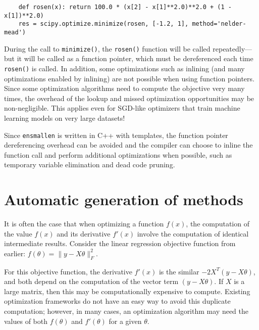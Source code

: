 \documentclass{article}
\begin{document}
\vspace*{-0.3em}
\begin{verbatim}
    def rosen(x): return 100.0 * (x[2] - x[1]**2.0)**2.0 + (1 - x[1])**2.0)
    res = scipy.optimize.minimize(rosen, [-1.2, 1], method='nelder-mead')
\end{verbatim}
\vspace*{-0.3em}

During the call to {\tt minimize()}, the {\tt rosen()} function will be called
repeatedly---but it will be called as a function pointer, which must be
dereferenced each time {\tt rosen()} is called.  In addition, some
optimizations such as inlining (and many optimizations enabled by inlining) are
not possible when using function pointers.  Since some optimization algorithms
need to compute the objective very many times, the overhead of the lookup and
missed optimization opportunities may be non-negligible.  This applies even for
SGD-like optimizers that train machine learning models on very large datasets!

Since {\tt ensmallen} is written in C++ with templates, the function pointer
dereferencing overhead can be avoided and the compiler can choose to inline the
function call and perform additional optimizations when possible, such as
temporary variable elimination and dead code pruning.

\vspace*{-0.3em}
\section{Automatic generation of methods}
\vspace*{-0.5em}

It is often the case that when optimizing a function $f(x)$, the computation of
the value $f(x)$ and its derivative $f'(x)$ involve the computation of identical
intermediate results.  Consider the linear regression objective function from
earlier:
$f(\theta) = \| y - X\theta \|_F^2.$

For this objective function, the derivative $f'(x)$ is the similar $-2 X^T (y -
X \theta)$, and both depend on the computation of the vector term $(y - X
\theta)$.  If $X$ is a large matrix, then this may be computationally expensive
to compute.  Existing optimization frameworks do not have an easy way to avoid
this duplicate computation; however, in many cases, an optimization algorithm
may need the values of both $f(\theta)$ and $f'(\theta)$ for a given $\theta$.
\end{document}

